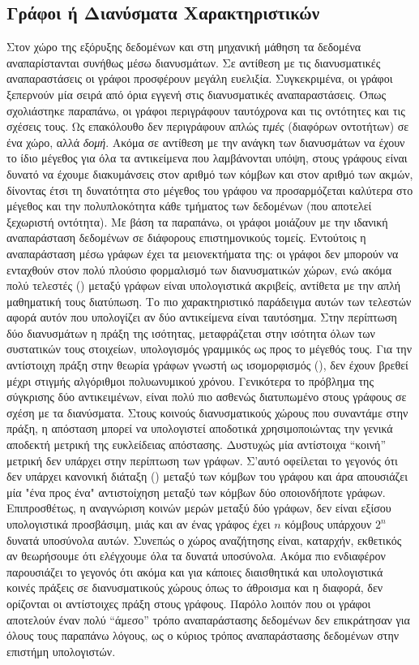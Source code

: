 \subsection{Γράφοι ή Διανύσματα Χαρακτηριστικών}
Στον χώρο της εξόρυξης δεδομένων και στη μηχανική μάθηση τα δεδομένα αναπαρίστανται συνήθως μέσω διανυσμάτων.
Σε αντίθεση με τις διανυσματικές αναπαραστάσεις οι γράφοι προσφέρουν μεγάλη ευελιξία.
Συγκεκριμένα, οι γράφοι ξεπερνούν μία σειρά από όρια εγγενή στις διανυσματικές αναπαραστάσεις.
Όπως σχολιάστηκε παραπάνω, οι γράφοι περιγράφουν ταυτόχρονα και τις οντότητες και τις σχέσεις τους.
Ως επακόλουθο δεν περιγράφουν απλώς \textit{τιμές} (διαφόρων οντοτήτων) σε ένα χώρο, αλλά \textit{δομή}.
Ακόμα σε αντίθεση με την ανάγκη των διανυσμάτων να έχουν το ίδιο μέγεθος για όλα τα αντικείμενα που λαμβάνονται υπόψη, στους γράφους είναι δυνατό να έχουμε διακυμάνσεις στον αριθμό των κόμβων και στον αριθμό των ακμών, δίνοντας έτσι τη δυνατότητα στο μέγεθος του γράφου να προσαρμόζεται καλύτερα στο μέγεθος και την πολυπλοκότητα κάθε τμήματος των δεδομένων (που αποτελεί ξεχωριστή οντότητα).
Με βάση τα παραπάνω, οι γράφοι μοιάζουν με την ιδανική αναπαράσταση δεδομένων σε διάφορους επιστημονικούς τομείς.
Εντούτοις η αναπαράσταση μέσω γράφων έχει τα μειονεκτήματα της: οι γράφοι δεν μπορούν να ενταχθούν στον πολύ πλούσιο φορμαλισμό των διανυσματικών χώρων, ενώ ακόμα πολύ τελεστές () μεταξύ γράφων είναι υπολογιστικά ακριβείς, αντίθετα με την απλή μαθηματική τους διατύπωση.
Το πιο χαρακτηριστικό παράδειγμα αυτών των τελεστών αφορά αυτόν που υπολογίζει αν δύο αντικείμενα είναι ταυτόσημα.
Στην περίπτωση δύο διανυσμάτων η πράξη της ισότητας, μεταφράζεται στην ισότητα όλων των συστατικών τους στοιχείων, υπολογισμός γραμμικός ως προς το μέγεθός τους.
Για την αντίστοιχη πράξη στην θεωρία γράφων γνωστή ως ισομορφισμός (), δεν έχουν βρεθεί μέχρι στιγμής αλγόριθμοι πολυωνυμικού χρόνου.
Γενικότερα το πρόβλημα της σύγκρισης δύο αντικειμένων, είναι πολύ πιο ασθενώς διατυπωμένο στους γράφους σε σχέση με τα διανύσματα.
Στους κοινούς διανυσματικούς χώρους που συναντάμε στην πράξη, η απόσταση μπορεί να υπολογιστεί αποδοτικά χρησιμοποιώντας την γενικά αποδεκτή μετρική της ευκλείδειας απόστασης.
Δυστυχώς μία αντίστοιχα ``κοινή'' μετρική δεν υπάρχει στην περίπτωση των γράφων.
Σ'αυτό οφείλεται το γεγονός ότι δεν υπάρχει κανονική διάταξη () μεταξύ των κόμβων του γράφου και άρα απουσιάζει μία "ένα προς ένα" αντιστοίχηση μεταξύ των κόμβων δύο οποιονδήποτε γράφων.
Επιπροσθέτως, η αναγνώριση κοινών μερών μεταξύ δύο γράφων, δεν είναι εξίσου υπολογιστικά προσβάσιμη, μιάς και αν ένας γράφος έχει $n$ κόμβους υπάρχουν $2^{n}$ δυνατά υποσύνολα αυτών.
Συνεπώς ο χώρος αναζήτησης είναι, καταρχήν, εκθετικός αν θεωρήσουμε ότι ελέγχουμε όλα τα δυνατά υποσύνολα.
Ακόμα πιο ενδιαφέρον παρουσιάζει το γεγονός ότι ακόμα και για κάποιες διαισθητικά και υπολογιστικά κοινές πράξεις σε διανυσματικούς χώρους όπως το άθροισμα και η διαφορά, δεν ορίζονται οι αντίστοιχες πράξη στους γράφους.
Παρόλο λοιπόν που οι γράφοι αποτελούν έναν πολύ ``άμεσο'' τρόπο αναπαράστασης δεδομένων δεν επικράτησαν για όλους τους παραπάνω λόγους, ως ο κύριος τρόπος αναπαράστασης δεδομένων στην επιστήμη υπολογιστών.
